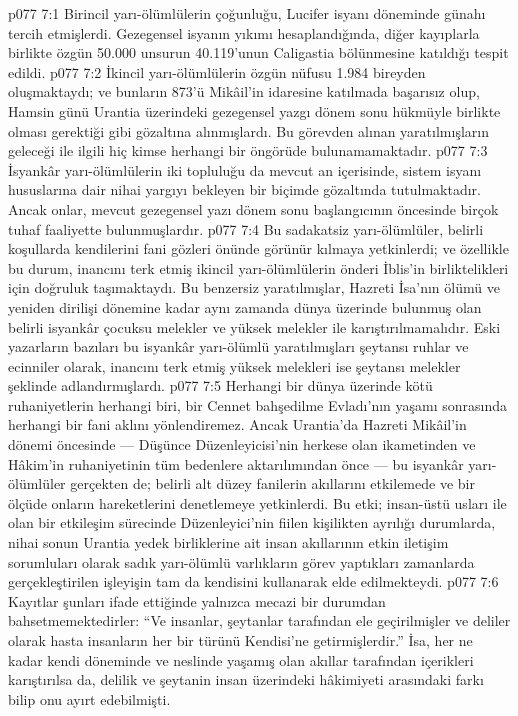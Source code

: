 \vs p077 7:1 Birincil yarı\hyp{}ölümlülerin çoğunluğu, Lucifer isyanı döneminde günahı tercih etmişlerdi. Gezegensel isyanın yıkımı hesaplandığında, diğer kayıplarla birlikte özgün 50.000 unsurun 40.119’unun Caligastia bölünmesine katıldığı tespit edildi.
\vs p077 7:2 İkincil yarı\hyp{}ölümlülerin özgün nüfusu 1.984 bireyden oluşmaktaydı; ve bunların 873’ü Mikâil’in idaresine katılmada başarısız olup, Hamsin günü Urantia üzerindeki gezegensel yazgı dönem sonu hükmüyle birlikte olması gerektiği gibi gözaltına alınmışlardı. Bu görevden alınan yaratılmışların geleceği ile ilgili hiç kimse herhangi bir öngörüde bulunamamaktadır.
\vs p077 7:3 İsyankâr yarı\hyp{}ölümlülerin iki topluluğu da mevcut an içerisinde, sistem isyanı hususlarına dair nihai yargıyı bekleyen bir biçimde gözaltında tutulmaktadır. Ancak onlar, mevcut gezegensel yazı dönem sonu başlangıcının öncesinde birçok tuhaf faaliyette bulunmuşlardır.
\vs p077 7:4 Bu sadakatsiz yarı\hyp{}ölümlüler, belirli koşullarda kendilerini fani gözleri önünde görünür kılmaya yetkinlerdi; ve özellikle bu durum, inancını terk etmiş ikincil yarı\hyp{}ölümlülerin önderi İblis’in birliktelikleri için doğruluk taşımaktaydı. Bu benzersiz yaratılmışlar, Hazreti İsa’nın ölümü ve yeniden dirilişi dönemine kadar aynı zamanda dünya üzerinde bulunmuş olan belirli isyankâr çocuksu melekler ve yüksek melekler ile karıştırılmamalıdır. Eski yazarların bazıları bu isyankâr yarı\hyp{}ölümlü yaratılmışları şeytansı ruhlar ve ecinniler olarak, inancını terk etmiş yüksek melekleri ise şeytansı melekler şeklinde adlandırmışlardı.
\vs p077 7:5 Herhangi bir dünya üzerinde kötü ruhaniyetlerin herhangi biri, bir Cennet bahşedilme Evladı’nın yaşamı sonrasında herhangi bir fani aklını yönlendiremez. Ancak Urantia’da Hazreti Mikâil’in dönemi öncesinde --- Düşünce Düzenleyicisi’nin herkese olan ikametinden ve Hâkim’in ruhaniyetinin tüm bedenlere aktarılımından önce --- bu isyankâr yarı\hyp{}ölümlüler gerçekten de; belirli alt düzey fanilerin akıllarını etkilemede ve bir ölçüde onların hareketlerini denetlemeye yetkinlerdi. Bu etki; insan\hyp{}üstü usları ile olan bir etkileşim sürecinde Düzenleyici’nin fiilen kişilikten ayrılığı durumlarda, nihai sonun Urantia yedek birliklerine ait insan akıllarının etkin iletişim sorumluları olarak sadık yarı\hyp{}ölümlü varlıkların görev yaptıkları zamanlarda gerçekleştirilen işleyişin tam da kendisini kullanarak elde edilmekteydi.
\vs p077 7:6 Kayıtlar şunları ifade ettiğinde yalnızca mecazi bir durumdan bahsetmemektedirler: “Ve insanlar, şeytanlar tarafından ele geçirilmişler ve deliler olarak hasta insanların her bir türünü Kendisi’ne getirmişlerdir.” İsa, her ne kadar kendi döneminde ve neslinde yaşamış olan akıllar tarafından içerikleri karıştırılsa da, delilik ve şeytanin insan üzerindeki hâkimiyeti arasındaki farkı bilip onu ayırt edebilmişti.
